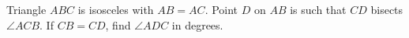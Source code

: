 Triangle $ABC$ is isosceles with $AB=AC$. Point $D$ on $AB$ is such that $CD$ bisects $\angle ACB$. If $CB=CD$, find $\angle ADC$ in degrees.
